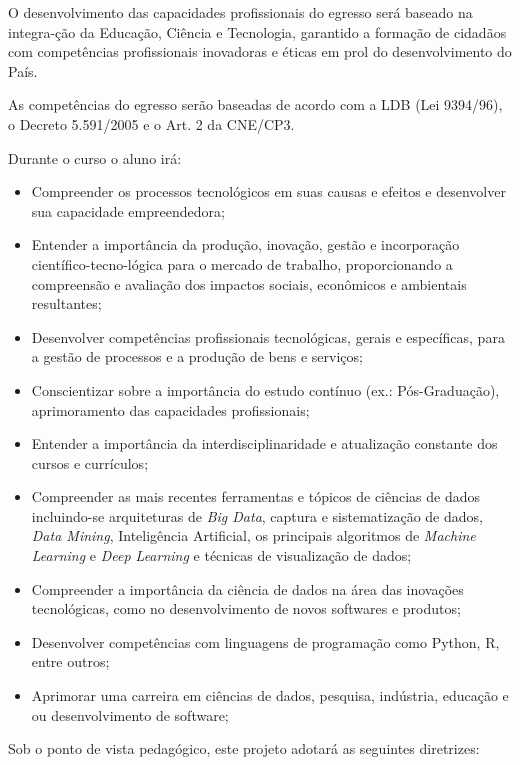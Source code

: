 \documentclass[a4paper, 12pt, openright, oneside, german, french, english, brazil]{abntex2}
\begin{document}
O desenvolvimento das capacidades profissionais do egresso será baseado na integra-ção da Educação, Ciência e Tecnologia, garantido a formação de cidadãos com competências profissionais inovadoras e éticas em prol do desenvolvimento do País.

As competências do egresso serão baseadas de acordo com a LDB (Lei 9394/96), o Decreto 5.591/2005 e o Art. 2 da CNE/CP3.

Durante o curso o aluno irá:

\begin{itemize}
\item Compreender os processos tecnológicos em suas causas e efeitos e desenvolver sua capacidade empreendedora;
\item Entender a importância da produção, inovação, gestão e incorporação científico-tecno-lógica para o mercado de trabalho, proporcionando a compreensão e avaliação dos impactos sociais, econômicos e ambientais resultantes;
\item Desenvolver competências profissionais tecnológicas, gerais e específicas, para a gestão de processos e a produção de bens e serviços;
\item Conscientizar sobre a importância do estudo contínuo (ex.: Pós-Graduação), aprimoramento das capacidades profissionais;
\item Entender a importância da interdisciplinaridade e atualização constante dos cursos e currículos;
\item Compreender as mais recentes ferramentas e tópicos de ciências de dados incluindo-se arquiteturas de \textit{Big Data}, captura e sistematização de dados, \textit{Data Mining}, Inteligência Artificial, os principais algoritmos de \textit{Machine Learning} e \textit{Deep Learning} e técnicas de visualização de dados;
\item Compreender a importância da ciência de dados na área das inovações tecnológicas, como no desenvolvimento de novos softwares e produtos;
\item Desenvolver competências com linguagens de programação como Python, R, entre outros;
\item Aprimorar uma carreira em ciências de dados, pesquisa, indústria, educação e ou desenvolvimento de software;
\end{itemize}

Sob o ponto de vista pedagógico, este projeto adotará as seguintes diretrizes:
\end{document}
